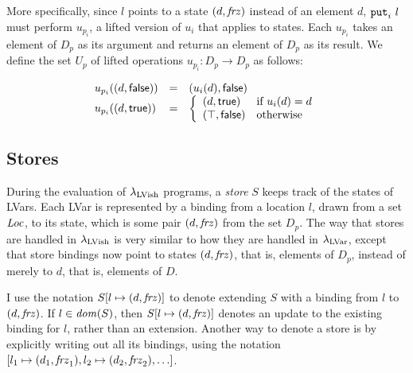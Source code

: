 More specifically, since $l$ points to a state $(d, \mathit{frz})$
instead of an element $d$, $\mbox{\texttt{put}}_i~l$ must perform $u_{p_i}$, a
lifted version of $u_i$ that applies to states. Each $u_{p_i}$ takes
an element of $D_p$ as its argument and returns an element of $D_p$ as
its result.  We define the set $U_p$ of lifted operations $u_{p_i} :
D_p \rightarrow D_p$ as follows:

  \begin{displaymath}
    \begin{array}{lcl}
      u_{p_i}((d, \textsf{false})) & = & (u_i(d), \textsf{false}) \\ 
      u_{p_i}((d, \textsf{true})) & = & \left\{
                                       \begin{array}{ll}
                                         (d, \textsf{true}) & \mbox{if } u_i(d) = d \\ 
                                         (\top, \textsf{false}) & \mbox{otherwise}
                                       \end{array}
                                     \right. \\
    \end{array}
  \end{displaymath}

\subsection{Stores}

During the evaluation of $\lambda_{\textrm{LVish}}$ programs, a \emph{store} $S$
keeps track of the states of LVars.  Each LVar is represented by a
binding from a location $l$, drawn from a set $\mathit{Loc}$, to its state,
which is some pair $(d, \mathit{frz})$ from the set $D_p$.  The way
that stores are handled in $\lambda_{\textrm{LVish}}$ is very similar to how they
are handled in $\lambda_{\textrm{LVar}}$, except that store bindings now point to
states $(d, \mathit{frz})$, that is, elements of $D_p$, instead of
merely to $d$, that is, elements of $D$.

\DefStore

I use the notation $S[l \mapsto (d, \mathit{frz})]$ to denote extending $S$
with a binding from $l$ to $(d, \mathit{frz})$.  If $l \in \mathit{dom}(S)$,
then $S[l \mapsto (d, \mathit{frz})]$ denotes an update to the existing
binding for $l$, rather than an extension.  Another way to denote a
store is by explicitly writing out all its bindings, using the
notation $\store{\storebinding{l_1}{d_1}{\status_1},
  \storebinding{l_2}{d_2}{\status_2}, \dots}$.


